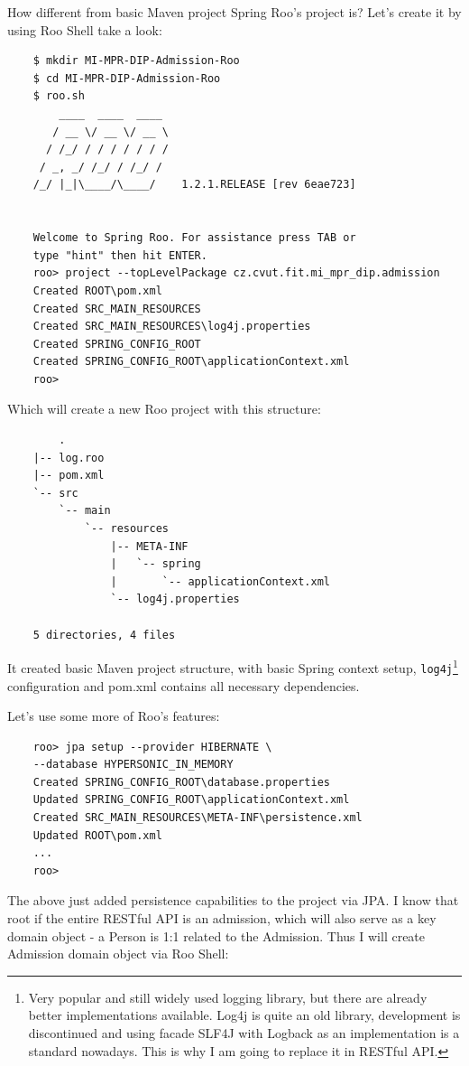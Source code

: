 	How different from basic Maven project Spring Roo's project is? Let's create it by using Roo Shell take a look:
	
	\begin{verbatim}
	$ mkdir MI-MPR-DIP-Admission-Roo
	$ cd MI-MPR-DIP-Admission-Roo
	$ roo.sh
	    ____  ____  ____
	   / __ \/ __ \/ __ \
	  / /_/ / / / / / / /
	 / _, _/ /_/ / /_/ /
	/_/ |_|\____/\____/    1.2.1.RELEASE [rev 6eae723]
	
	
	Welcome to Spring Roo. For assistance press TAB or
	type "hint" then hit ENTER.
	roo> project --topLevelPackage cz.cvut.fit.mi_mpr_dip.admission
	Created ROOT\pom.xml
	Created SRC_MAIN_RESOURCES
	Created SRC_MAIN_RESOURCES\log4j.properties
	Created SPRING_CONFIG_ROOT
	Created SPRING_CONFIG_ROOT\applicationContext.xml
	roo>
	\end{verbatim}
	
	Which will create a new Roo project with this structure:
	
	\begin{verbatim}
		.
	|-- log.roo
	|-- pom.xml
	`-- src
	    `-- main
	        `-- resources
	            |-- META-INF
	            |   `-- spring
	            |       `-- applicationContext.xml
	            `-- log4j.properties
	
	5 directories, 4 files
	\end{verbatim}
	
	It created basic Maven project structure, with basic Spring context setup, \verb|log4j|\footnote{Very popular and
	still widely used logging library, but there are already better implementations available. Log4j is quite an old
	library, development is discontinued and using facade SLF4J with Logback as an implementation is a standard nowadays.
	This is why I am going to replace it in RESTful API.} configuration and pom.xml contains all necessary dependencies.
	
	Let's use some more of Roo's features:
	
	\begin{verbatim}
	roo> jpa setup --provider HIBERNATE \
	--database HYPERSONIC_IN_MEMORY
	Created SPRING_CONFIG_ROOT\database.properties
	Updated SPRING_CONFIG_ROOT\applicationContext.xml
	Created SRC_MAIN_RESOURCES\META-INF\persistence.xml
	Updated ROOT\pom.xml
	...
	roo>
	\end{verbatim}
	
	The above just added persistence capabilities to the project via JPA. I know that root if the entire RESTful API is an
	admission, which will also serve as a key domain object - a Person is 1:1 related to the Admission. Thus I will create
	Admission domain object via Roo Shell:
	
